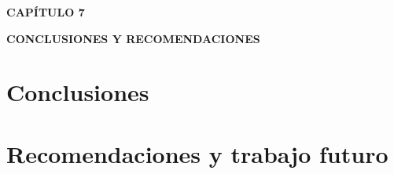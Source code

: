 \setcounter{chapter}{7}
\setcounter{section}{0} 
{\centering
{\large\bfseries CAPÍTULO 7}\par\vspace{0.3cm}
{\Large\bfseries CONCLUSIONES Y RECOMENDACIONES}\par}
\vspace{1cm}

\section{Conclusiones}
\section{Recomendaciones y trabajo futuro}
